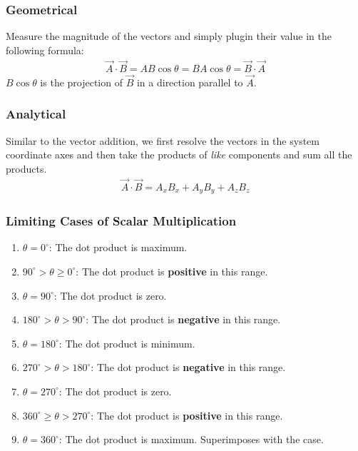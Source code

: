 \documentclass[12pt,b4paper]{article}
\begin{document}
\subsubsection*{Geometrical}
Measure the magnitude of the vectors and simply plugin their value in the following formula:
\begin{align}
    \Vec{A}\cdot\Vec{B}=AB\cos{\theta}=BA\cos{\theta}=\Vec{B}\cdot\Vec{A}
\end{align}
$B\cos{\theta}$ is the projection of $\Vec{B}$ in a direction parallel to $\Vec{A}$.
\subsubsection*{Analytical} Similar to the vector addition, we first resolve the vectors in the system coordinate axes and then take the products of \textit{like} components and sum all the products.
\begin{align}
    \Vec{A}\cdot\Vec{B}=A_xB_x + A_yB_y + A_zB_z
\end{align}
\thispagestyle{empty}
\subsubsection*{Limiting Cases of Scalar Multiplication}
\begin{enumerate}
    \item $\theta=0^\circ$: The dot product is maximum.
    \item $90^\circ>\theta\geq 0^\circ$: The dot product is \textbf{positive} in this range.
    \item $\theta=90^\circ$: The dot product is zero.
    \item $180^\circ>\theta> 90^\circ$: The dot product is \textbf{negative} in this range.
    \item $\theta=180^\circ$: The dot product is minimum.
    \item $270^\circ>\theta> 180^\circ$: The dot product is \textbf{negative} in this range.
    \item $\theta=270^\circ$: The dot product is zero.
    \item $360^\circ\geq\theta>270^\circ$: The dot product is \textbf{positive} in this range.
    \item $\theta=360^\circ$: The dot product is maximum. Superimposes with the  case.
\end{enumerate}
\end{document}
